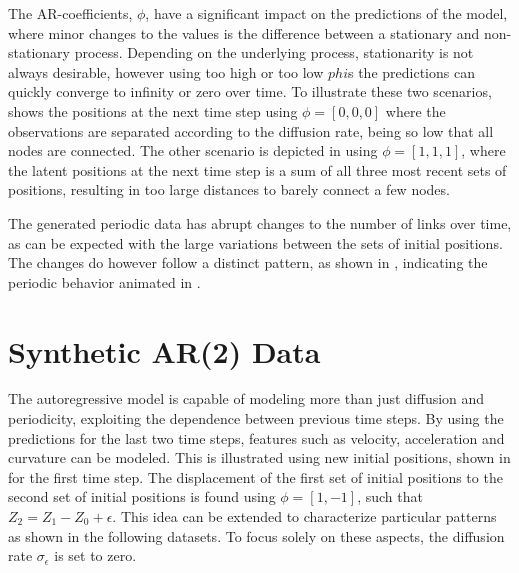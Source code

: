         The AR-coefficients, $\phi$, have a significant impact on the predictions of the model, where minor changes to the values is the difference between a stationary and non-stationary process. Depending on the underlying process, stationarity is not always desirable, however using too high or too low $phi$s the predictions can quickly converge to infinity or zero over time. 
        To illustrate these two scenarios,  shows the positions at the next time step using $\phi=[0,0,0]$ where the observations are separated according to the diffusion rate, being so low that all nodes are connected. 
        The other scenario is depicted in  using $\phi=[1,1,1]$, where the latent positions at the next time step is a sum of all three most recent sets of positions, resulting in too large distances to barely connect a few nodes.
        
        The generated periodic data has abrupt changes to the number of links over time, as can be expected with the large variations between the sets of initial positions. The changes do however follow a distinct pattern, as shown in , indicating the periodic behavior animated in .
        
\section{Synthetic AR(2) Data}
    
    The autoregressive model is capable of modeling more than just diffusion and periodicity, exploiting the dependence between previous time steps. By using the predictions for the last two time steps, features such as velocity, acceleration and curvature can be modeled. This is illustrated using new initial positions, shown in  for the first time step. 
    The displacement of the first set of initial positions to the second set of initial positions is found using $\phi=[1,-1]$, such that $Z_2 = Z_1 - Z_0 + \epsilon$. This idea can be extended to characterize particular patterns as shown in the following datasets. To focus solely on these aspects, the diffusion rate $\sigma_\epsilon$ is set to zero.
        
